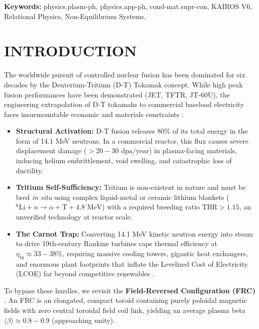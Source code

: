 \documentclass[10pt,twocolumn]{article}
\begin{document}
\vspace{1em}
\noindent\textbf{Keywords:} physics.plasm-ph, physics.app-ph, cond-mat.supr-con, KAIROS V6, Relational Physics, Non-Equilibrium Systems.

\vspace{1em}






\section{INTRODUCTION}

The worldwide pursuit of controlled nuclear fusion has been dominated for six decades by the Deuterium-Tritium (D-T) Tokamak concept. While high peak fusion performances have been demonstrated (JET, TFTR, JT-60U), the engineering extrapolation of D-T tokamaks to commercial baseload electricity faces insurmountable economic and materials constraints \cite{Ono2000, Freidberg2007}:
\begin{itemize}
  \item \textbf{Structural Activation:} D-T fusion releases $80\%$ of its total energy in the form of 14.1 MeV neutrons. In a commercial reactor, this flux causes severe displacement damage ($> 20 - 30\text{ dpa/year}$) in plasma-facing materials, inducing helium embrittlement, void swelling, and catastrophic loss of ductility.
  \item \textbf{Tritium Self-Sufficiency:} Tritium is non-existent in nature and must be bred \textit{in situ} using complex liquid-metal or ceramic lithium blankets ($^6\text{Li} + n \to \alpha + \text{T} + 4.8\text{ MeV}$) with a required breeding ratio $\text{TBR} > 1.15$, an unverified technology at reactor scale.
  \item \textbf{The Carnot Trap:} Converting 14.1 MeV kinetic neutron energy into steam to drive 19th-century Rankine turbines caps thermal efficiency at $\eta_{\text{th}} \approx 33 - 38\%$, requiring massive cooling towers, gigantic heat exchangers, and enormous plant footprints that inflate the Levelized Cost of Electricity (LCOE) far beyond competitive renewables \cite{Slough2011}.
\end{itemize}

To bypass these hurdles, we revisit the \textbf{Field-Reversed Configuration (FRC)} \cite{Tuszewski1988, Steinhauer2011}. An FRC is an elongated, compact toroid containing purely poloidal magnetic fields with zero central toroidal field coil link, yielding an average plasma beta $\langle \beta \rangle \approx 0.8 - 0.9$ (approaching unity). 
\end{document}
